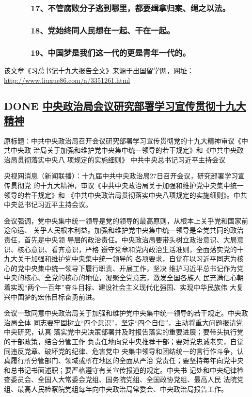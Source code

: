 \documentclass[11pt]{ctexart}
\begin{document}
{{{{\subsubsection{　 　　17、不管腐败分子逃到哪里，都要缉拿归案、绳之以法。}
\label{sec:org0b28b88}

\subsubsection{　 　　18、党始终同人民想在一起、干在一起。}
\label{sec:org2c25e14}

\subsubsection{　 　　19、中国梦是我们这一代的更是青年一代的。}
\label{sec:orge43bec5}

该文章《习总书记十九大报告全文》来源于出国留学网，网址：\url{http://www.liuxue86.com/a/3351261.html}
\subsection{{\bfseries\sffamily DONE} \href{http://news.ifeng.com/a/20171027/52824191\_0.shtml}{中央政治局会议研究部署学习宣传贯彻十九大精神}}
\label{sec:org0263e62}
原标题：中共中央政治局召开会议研究部署学习宣传贯彻党的十九大精神审议《中共中央政
治局关于加强和维护党中央集中统一领导的若干规定》和《中共中央政治局贯彻落实中央八
项规定的实施细则》 中共中央总书记习近平主持会议

央视网消息（新闻联播）：十九届中共中央政治局27日召开会议，研究部署学习宣传贯彻党
的十九大精神，审议《中共中央政治局关于加强和维护党中央集中统一领导的若干规定》和
《中共中央政治局贯彻落实中央八项规定的实施细则》。中共中央总书记习近平主持会议。

会议强调，党中央集中统一领导是党的领导的最高原则，从根本上关乎党和国家前途命运、
关乎人民根本利益。加强和维护党中央集中统一领导是全党共同的政治责任，首先是中央领
导层的政治责任。中央政治局要带头树立政治意识、大局意识、核心意识、看齐意识，严格
遵守党章和党内政治生活准则，全面落实党的十九大关于加强和维护党中央集中统一领导的
各项要求，自觉在以习近平同志为核心的党中央集中统一领导下履行职责、开展工作，坚决
维护习近平总书记作为党中央的核心、全党的核心的地位，凝聚全党意志，激发全国各族人
民充满信心朝着实现“两个一百年”奋斗目标、建设社会主义现代化强国、实现中华民族伟
大复兴中国梦的宏伟目标奋勇前进。

会议一致同意中央政治局关于加强和维护党中央集中统一领导的若干规定。中央政治局全体
同志要牢固树立“四个意识”，坚定“四个自信”，主动将重大问题报请党中央研究，认真
落实党中央决策部署并及时报告落实的重要进展；要带头执行党的干部政策，结合分管工作
负责任地向党中央推荐干部；要对党忠诚老实，自觉同违反党章、破坏党的纪律、危害党中
央集中领导和团结统一的言行作斗争，认真履行所分管部门、领域或所在地区的全面从严治
党责任；要坚持每年向党中央和总书记书面述职；要严格遵守有关宣传报道的规定。中央书
记处和中央纪律检查委员会、全国人大常委会党组、国务院党组、全国政协党组、最高人民
法院党组、最高人民检察院党组每年向中央政治局常委会、中央政治局报告工作。

}}}}
\end{document}
